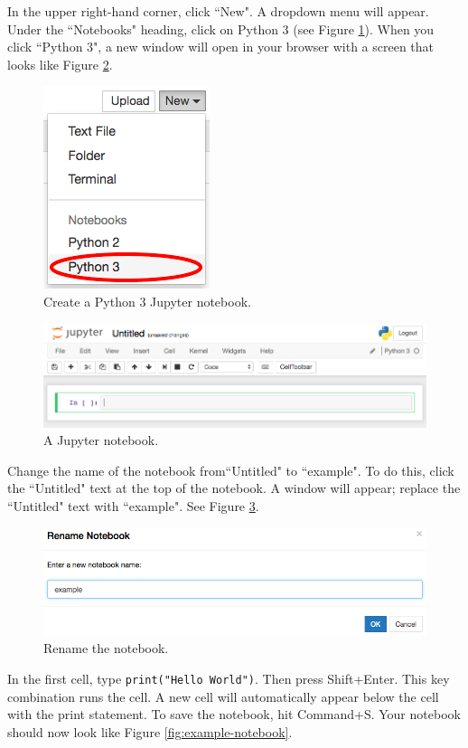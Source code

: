 \documentclass[11pt,a4paper]{article}
\begin{document}
In the upper right-hand corner, click ``New".
A dropdown menu will appear.
Under the ``Notebooks" heading, click on Python 3 (see Figure \ref{fig:jupyter-dropdown}).
When you click ``Python 3", a new window will open in your browser with a screen that looks like Figure \ref{fig:jupyter}.

\begin{figure}[h]
\centering
\includegraphics[width=.3\textwidth]{figures/jupyter_dropdown.png}
\caption{Create a Python 3 Jupyter notebook.}
\label{fig:jupyter-dropdown}
\end{figure}

\begin{figure}[h]
\centering
\includegraphics[width=.7\textwidth]{figures/jupyter.png}
\caption{A Jupyter notebook.}
\label{fig:jupyter}
\end{figure}

Change the name of the notebook from``Untitled" to ``example".
To do this, click the ``Untitled" text at the top of the notebook.
A window will appear; replace the ``Untitled" text with ``example".
See Figure \ref{fig:rename-notebook}.

\begin{figure}[h]
\centering
\includegraphics[width=.7\textwidth]{figures/rename_notebook.png}
\caption{Rename the notebook.}
\label{fig:rename-notebook}
\end{figure}

In the first cell, type \texttt{print("Hello World")}.
Then press Shift+Enter.
This key combination runs the cell.
A new cell will automatically appear below the cell with the print statement.
To save the notebook, hit Command+S.
Your notebook should now look like Figure \ref{fig:example-notebook}.
\end{document}
